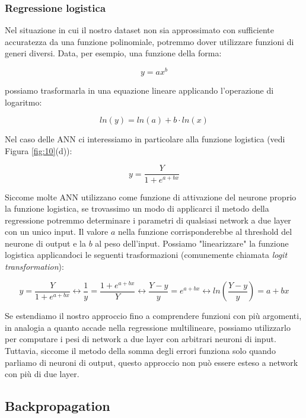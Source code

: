 \documentclass[10pt,a4paper]{article}
\begin{document}
\subsubsection{Regressione logistica}

Nel situazione in cui il nostro dataset non sia approssimato con sufficiente accuratezza da una funzione polinomiale, potremmo dover utilizzare funzioni di generi diversi. Data, per esempio, una funzione della forma:

$$
y = ax^b
$$

possiamo trasformarla in una equazione lineare applicando l'operazione di logaritmo:

$$
ln(y) = ln(a) + b \cdot ln(x)
$$

Nel caso delle ANN ci interessiamo in particolare alla funzione logistica (vedi Figura \ref{fig:10}(d)):

$$
y = \frac{Y}{1 + e^{a+bx}}
$$

Siccome molte ANN utilizzano come funzione di attivazione del neurone proprio la funzione logistica, se trovassimo un modo di applicarci il metodo della regressione potremmo determinare i parametri di qualsiasi network a due layer con un unico input. Il valore $a$ nella funzione corrisponderebbe al threshold del neurone di output e la $b$ al peso dell'input. Possiamo "linearizzare" la funzione logistica applicandoci le seguenti trasformazioni (comunemente chiamata \emph{logit transformation}):

$$
y = \frac{Y}{1 + e^{a+bx}} \leftrightarrow \frac{1}{y} = \frac{1 + e^{a+bx}}{Y} \leftrightarrow \frac{Y - y}{y} = e^{a+bx} \leftrightarrow ln(\frac{Y - y}{y}) = a+bx
$$

Se estendiamo il nostro approccio fino a comprendere funzioni con più argomenti, in analogia a quanto accade nella regressione multilineare, possiamo utilizzarlo per computare i pesi di network a due layer con arbitrari neuroni di input. Tuttavia, siccome il metodo della somma degli errori funziona solo quando parliamo di neuroni di output, questo approccio non può essere esteso a network con più di due layer.

\subsection{Backpropagation}
\end{document}
